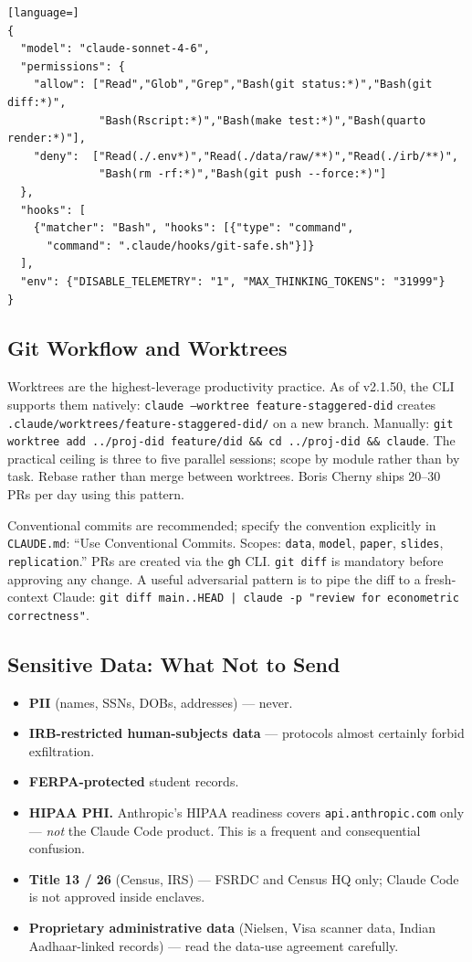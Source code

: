 \documentclass[11pt]{article}
\begin{document}
\begin{lstlisting}[language=]
{
  "model": "claude-sonnet-4-6",
  "permissions": {
    "allow": ["Read","Glob","Grep","Bash(git status:*)","Bash(git diff:*)",
              "Bash(Rscript:*)","Bash(make test:*)","Bash(quarto render:*)"],
    "deny":  ["Read(./.env*)","Read(./data/raw/**)","Read(./irb/**)",
              "Bash(rm -rf:*)","Bash(git push --force:*)"]
  },
  "hooks": [
    {"matcher": "Bash", "hooks": [{"type": "command",
      "command": ".claude/hooks/git-safe.sh"}]}
  ],
  "env": {"DISABLE_TELEMETRY": "1", "MAX_THINKING_TOKENS": "31999"}
}
\end{lstlisting}

\subsection{Git Workflow and Worktrees}

Worktrees are the highest-leverage productivity practice. As of v2.1.50, the CLI supports them natively: \texttt{claude --worktree feature-staggered-did} creates \texttt{.claude/worktrees/feature-staggered-did/} on a new branch. Manually: \texttt{git worktree add ../proj-did feature/did \&\& cd ../proj-did \&\& claude}. The practical ceiling is three to five parallel sessions; scope by module rather than by task. Rebase rather than merge between worktrees. Boris Cherny ships 20--30 PRs per day using this pattern.

Conventional commits are recommended; specify the convention explicitly in \texttt{CLAUDE.md}: ``Use Conventional Commits. Scopes: \texttt{data}, \texttt{model}, \texttt{paper}, \texttt{slides}, \texttt{replication}.'' PRs are created via the \texttt{gh} CLI. \texttt{git diff} is mandatory before approving any change. A useful adversarial pattern is to pipe the diff to a fresh-context Claude: \texttt{git diff main..HEAD | claude -p "review for econometric correctness"}.

\subsection{Sensitive Data: What Not to Send}

\begin{itemize}[leftmargin=*,nosep]
    \item \textbf{PII} (names, SSNs, DOBs, addresses) --- never.
    \item \textbf{IRB-restricted human-subjects data} --- protocols almost certainly forbid exfiltration.
    \item \textbf{FERPA-protected} student records.
    \item \textbf{HIPAA PHI.} Anthropic's HIPAA readiness covers \texttt{api.anthropic.com} only --- \emph{not} the Claude Code product. This is a frequent and consequential confusion.
    \item \textbf{Title 13 / 26} (Census, IRS) --- FSRDC and Census HQ only; Claude Code is not approved inside enclaves.
    \item \textbf{Proprietary administrative data} (Nielsen, Visa scanner data, Indian Aadhaar-linked records) --- read the data-use agreement carefully.
\end{itemize}
\end{document}
